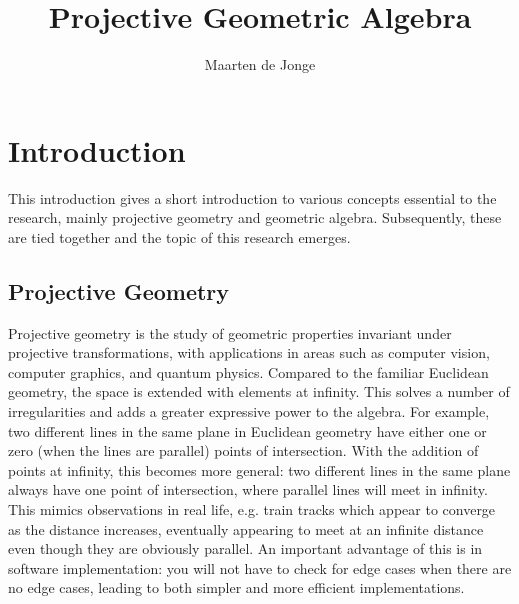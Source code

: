 \documentclass[a4paper, 10pt]{article}
\author{Maarten de Jonge}
\title{Projective Geometric Algebra}
\begin{document}
\newcommand{\rp}{$\mathbb{R}^{3,3}$ }

\maketitle

\section{Introduction}
This introduction gives a short introduction to various concepts essential to
the research, mainly projective geometry and geometric algebra. Subsequently,
these are tied together and the topic of this research emerges.

\subsection{Projective Geometry}
Projective geometry is the study of geometric properties invariant under
projective transformations, with applications in areas such as computer vision,
computer graphics, and quantum physics. Compared to the familiar Euclidean
geometry, the space is extended with elements at infinity. This solves a number
of irregularities and adds a greater expressive power to the algebra. For
example, two different lines in the same plane in Euclidean geometry have either
one or zero (when the lines are parallel) points of intersection. With the
addition of points at infinity, this becomes more general: two different lines
in the same plane always have one point of intersection, where parallel lines
will meet in infinity. This mimics observations in real life, e.g. train tracks
which appear to converge as the distance increases, eventually
appearing to meet at an infinite distance even though they are obviously parallel.
An important advantage of this is in software implementation: you will not have
to check for edge cases when there are no edge cases, leading to both simpler
and more efficient implementations.
\end{document}

